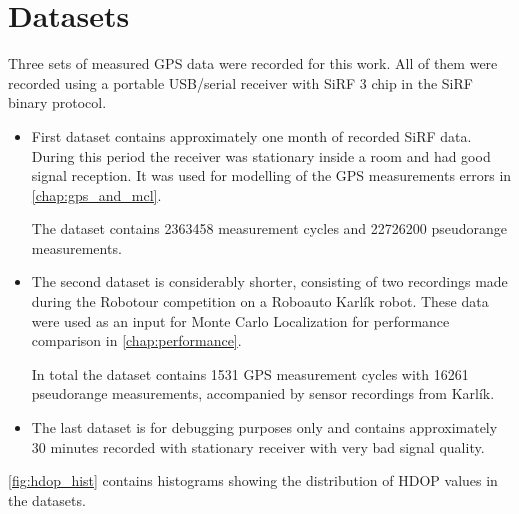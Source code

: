 \chapter{Datasets}
\label{chap:datasets}

Three sets of measured GPS data were recorded for this work.
All of them were recorded using a portable USB/serial receiver with SiRF 3 chip
in the SiRF binary protocol.

\begin{itemize}

\item
First dataset contains approximately one month of recorded SiRF data.
During this period the receiver was stationary inside a room and had good signal 
reception. 
It was used for modelling of the GPS measurements errors in \autoref{chap:gps_and_mcl}.

The dataset contains \num{2363458} measurement cycles and
\num{22726200} pseudorange measurements.

\item
The second dataset is considerably shorter, consisting of two recordings made during
the Robotour competition \cite{robotour} on a Roboauto Karlík \cite{karlik} robot.
These data were used as an input for Monte Carlo Localization for performance comparison in \autoref{chap:performance}.

In total the dataset contains \num{1531} GPS measurement cycles with
\num{16261} pseudorange measurements, accompanied by sensor recordings from Karlík.

\item
The last dataset is for debugging purposes only and contains approximately
30 minutes recorded with stationary receiver with very bad signal quality.

\end{itemize}

\autoref{fig:hdop_hist} contains histograms showing the distribution of HDOP values in the datasets.

